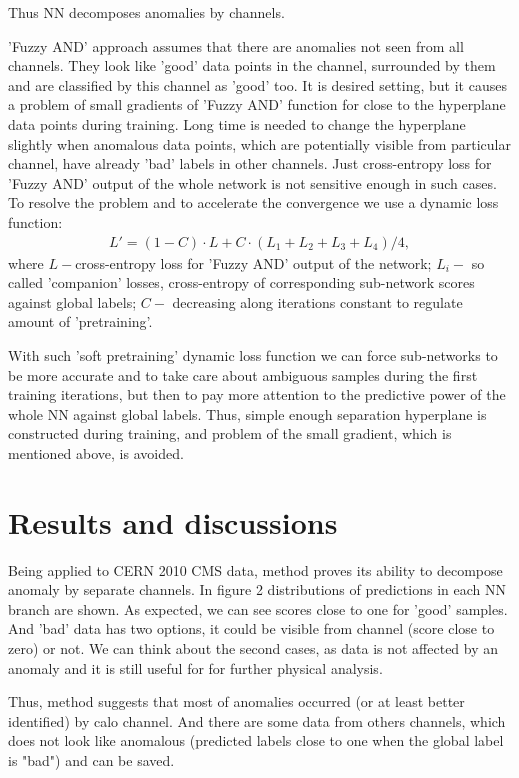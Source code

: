 \documentclass[a4paper]{jpconf}
\begin{document}
Thus NN decomposes anomalies by channels.


'Fuzzy AND' approach assumes that there are anomalies not seen from all channels. They look like 'good' data points in the channel, surrounded by them and are classified by this channel as 'good' too. It is desired setting, but it causes a problem of small gradients of 'Fuzzy AND' function for close to the hyperplane data points during training. Long time is needed to change the hyperplane slightly when anomalous data points, which are potentially visible from particular channel, have already 'bad' labels in other channels. Just cross-entropy loss for 'Fuzzy AND' output of the whole network is not sensitive enough in such cases. To resolve the problem and to accelerate the convergence we use a dynamic loss function:
\begin{eqnarray}
L' = (1-C) \cdot L + C \cdot (L_1 + L_2 + L_3 + L_4)/ 4 ,
\end{eqnarray}
where $L - $cross-entropy loss for 'Fuzzy AND' output of the network; $L_i - $ so called 'companion' losses, cross-entropy of corresponding sub-network scores against global labels; $C - $ decreasing along iterations constant to regulate amount of 'pretraining'.

With such 'soft pretraining' dynamic loss function we can force sub-networks to be more accurate and to take care about ambiguous samples during the first training iterations, but then to pay more attention to the predictive power of the whole NN against global labels. Thus, simple enough separation hyperplane is constructed during training, and problem of the small gradient, which is mentioned above, is avoided.

\section{Results and discussions}
Being applied to CERN 2010 CMS data, method proves its ability to decompose anomaly by separate channels. In figure 2 distributions of predictions in each NN branch are shown. As expected, we can see scores close to one for 'good' samples. And 'bad' data has two options, it could be visible from channel (score close to zero) or not. We can think about the second cases, as data is not affected by an anomaly and it is still useful for for further physical analysis.

Thus, method suggests that most of anomalies occurred (or at least better identified) by calo channel. And there are some data from others channels, which does not look like anomalous (predicted labels close to one when the global label is "bad") and can be saved.
\end{document}
